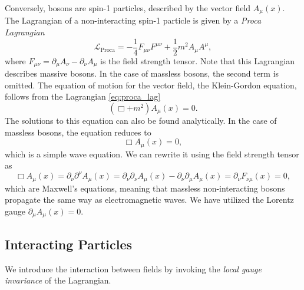 Conversely, bosons are spin-1 particles, described by the vector field $A_\mu(x)$.
The Lagrangian of a non-interacting spin-1 particle is given by a \emph{Proca Lagrangian}
\begin{equation}
    \label{eq:proca_lag}
    \mathcal{L}_{\text{Proca}} = - \frac{1}{4} F_{\mu\nu} F^{\mu\nu} + \frac{1}{2} m^2 A_\mu A^\mu,
\end{equation}
where $F_{\mu\nu} = \partial_\mu A_\nu - \partial_\nu A_\mu$ is the field strength tensor.
Note that this Lagrangian describes massive bosons. 
In the case of massless bosons, the second term is omitted.
The equation of motion for the vector field, the Klein-Gordon equation, follows from the Lagrangian \cref{eq:proca_lag}
\begin{equation}
    \label{eq:klein_gordon}
    \left( \Box + m^2 \right) A_\mu(x) = 0.
\end{equation}
The solutions to this equation can also be found analytically.
In the case of massless bosons, the equation reduces to 
\begin{equation}
    \label{eq:wave_eq}
    \Box A_\mu(x) = 0,
\end{equation}
which is a simple wave equation.
We can rewrite it using the field strength tensor as
\begin{equation}
    \Box A_\mu(x) = \partial_\nu \partial^\nu A_\mu(x) = \partial_\nu \partial_\nu A_\mu(x) - \partial_\nu \partial_\mu A_\mu(x) =  \partial_\nu F_{\nu\mu}(x) =  0,
\end{equation}
which are Maxwell's equations, meaning that massless non-interacting bosons propagate the same way as electromagnetic waves.
We have utilized the Lorentz gauge $\partial_\mu A_\mu(x) = 0$.


\subsection{Interacting Particles}
\label{sec:interacting_particles}
We introduce the interaction between fields by invoking the \emph{local gauge invariance} of the Lagrangian. 

